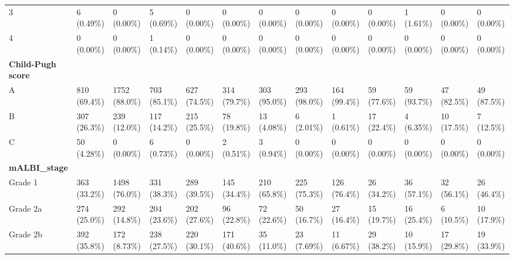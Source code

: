 \documentclass{article}
\begin{document}
\begin{landscape}
\begin{tiny}
\begin{tabularx}{\linewidth}{p{2.0cm}|X|X|X|X|X|X|X|X|X|X|X|X}
    3 &    6 (0.49\%)     &    0 (0.00\%)     &    5 (0.69\%)     &    0 (0.00\%)     &    0 (0.00\%)     &    0 (0.00\%)     &    0 (0.00\%)     &    0 (0.00\%)     &    0 (0.00\%)     &    1 (1.61\%)     &    0 (0.00\%)     &    0 (0.00\%)     \\
\rowcolor{gray!10}
    4 &    0 (0.00\%)     &    0 (0.00\%)     &    1 (0.14\%)     &    0 (0.00\%)     &    0 (0.00\%)     &    0 (0.00\%)     &    0 (0.00\%)     &    0 (0.00\%)     &    0 (0.00\%)     &    0 (0.00\%)     &    0 (0.00\%)     &    0 (0.00\%)     \\
\rowcolor{gray!30}
\textbf{Child-Pugh score }  &  &  &  &  &  &  &  &  &  &  &  &  \\
\rowcolor{gray!10}
    A &   810 (69.4\%)    &   1752 (88.0\%)   &   703 (85.1\%)    &   627 (74.5\%)    &   314 (79.7\%)    &   303 (95.0\%)    &   293 (98.0\%)    &   164 (99.4\%)    &    59 (77.6\%)    &    59 (93.7\%)    &    47 (82.5\%)    &    49 (87.5\%)    \\
\rowcolor{gray!10}
    B &   307 (26.3\%)    &   239 (12.0\%)    &   117 (14.2\%)    &   215 (25.5\%)    &    78 (19.8\%)    &    13 (4.08\%)    &    6 (2.01\%)     &    1 (0.61\%)     &    17 (22.4\%)    &    4 (6.35\%)     &    10 (17.5\%)    &    7 (12.5\%)     \\
\rowcolor{gray!10}
    C &    50 (4.28\%)    &    0 (0.00\%)     &    6 (0.73\%)     &    0 (0.00\%)     &    2 (0.51\%)     &    3 (0.94\%)     &    0 (0.00\%)     &    0 (0.00\%)     &    0 (0.00\%)     &    0 (0.00\%)     &    0 (0.00\%)     &    0 (0.00\%)     \\
\rowcolor{gray!30}
\textbf{mALBI\_stage }  &  &  &  &  &  &  &  &  &  &  &  &  \\
\rowcolor{gray!10}
    Grade 1 &   363 (33.2\%)    &   1498 (76.0\%)   &   331 (38.3\%)    &   289 (39.5\%)    &   145 (34.4\%)    &   210 (65.8\%)    &   225 (75.3\%)    &   126 (76.4\%)    &    26 (34.2\%)    &    36 (57.1\%)    &    32 (56.1\%)    &    26 (46.4\%)    \\
\rowcolor{gray!10}
    Grade 2a &   274 (25.0\%)    &   292 (14.8\%)    &   204 (23.6\%)    &   202 (27.6\%)    &    96 (22.8\%)    &    72 (22.6\%)    &    50 (16.7\%)    &    27 (16.4\%)    &    15 (19.7\%)    &    16 (25.4\%)    &    6 (10.5\%)     &    10 (17.9\%)    \\
\rowcolor{gray!10}
    Grade 2b &   392 (35.8\%)    &   172 (8.73\%)    &   238 (27.5\%)    &   220 (30.1\%)    &   171 (40.6\%)    &    35 (11.0\%)    &    23 (7.69\%)    &    11 (6.67\%)    &    29 (38.2\%)    &    10 (15.9\%)    &    17 (29.8\%)    &    19 (33.9\%)    \\

\end{tabularx}
\end{tiny}
\end{landscape}
\end{document}
